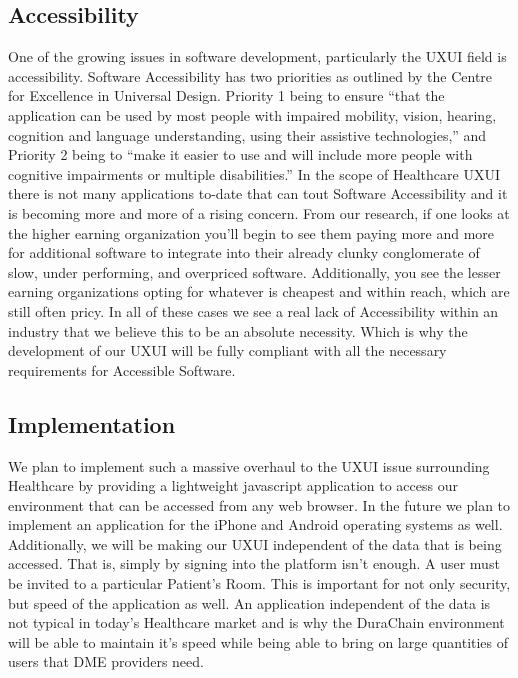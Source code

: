 \documentclass[12pt]{article}
\begin{document}
  \subsection{Accessibility}
  One of the growing issues in software development, particularly the UXUI field is accessibility. Software Accessibility has two priorities as outlined by the Centre for Excellence in Universal Design. Priority 1 being to ensure “that the application can be used by most people with impaired mobility, vision, hearing, cognition and language understanding, using their assistive technologies,” and Priority 2 being to “make it easier to use and will include more people with cognitive impairments or multiple disabilities.” In the scope of Healthcare UXUI there is not many applications to-date that can tout Software Accessibility and it is becoming more and more of a rising concern. From our research, if one looks at the higher earning organization you’ll begin to see them paying more and more for additional software to integrate into their already clunky conglomerate of slow, under performing, and overpriced software. Additionally, you see the lesser earning organizations opting for whatever is cheapest and within reach, which are still often pricy. In all of these cases we see a real lack of Accessibility within an industry that we believe this to be an absolute necessity. Which is why the development of our UXUI will be fully compliant with all the necessary requirements for Accessible Software.

  \subsection{Implementation}
  We plan to implement such a massive overhaul to the UXUI issue surrounding Healthcare by providing a lightweight javascript application to access our environment that can be accessed from any web browser. In the future we plan to implement an application for the iPhone and Android operating systems as well. Additionally, we will be making our UXUI independent of the data that is being accessed. That is, simply by signing into the platform isn’t enough. A user must be invited to a particular Patient’s Room. This is important for not only security, but speed of the application as well. An application independent of the data is not typical in today’s Healthcare market and is why the DuraChain environment will be able to maintain it’s speed while being able to bring on large quantities of users that DME providers need.
\end{document}
